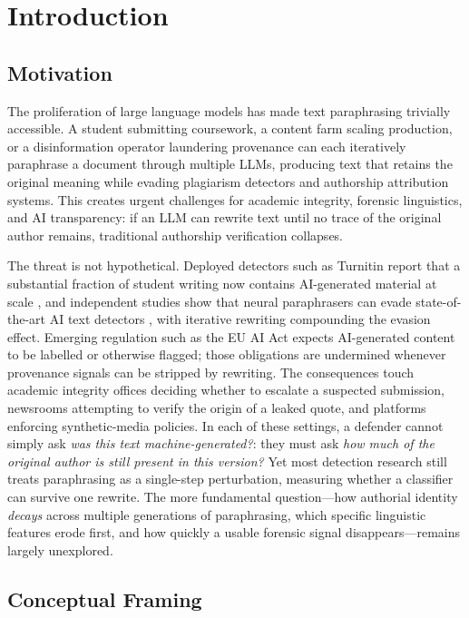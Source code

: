 \section{Introduction}

\subsection{Motivation}

The proliferation of large language models has made text paraphrasing trivially accessible. A student submitting coursework, a content farm scaling production, or a disinformation operator laundering provenance can each iteratively paraphrase a document through multiple LLMs, producing text that retains the original meaning while evading plagiarism detectors and authorship attribution systems. This creates urgent challenges for academic integrity, forensic linguistics, and AI transparency: if an LLM can rewrite text until no trace of the original author remains, traditional authorship verification collapses.

The threat is not hypothetical. Deployed detectors such as Turnitin report that a substantial fraction of student writing now contains AI-generated material at scale \cite{turnitin2024aiwriting}, and independent studies show that neural paraphrasers can evade state-of-the-art AI text detectors \cite{krishna2023dipper}, with iterative rewriting compounding the evasion effect. Emerging regulation such as the EU AI Act \cite{euaiact2024} expects AI-generated content to be labelled or otherwise flagged; those obligations are undermined whenever provenance signals can be stripped by rewriting. The consequences touch academic integrity offices deciding whether to escalate a suspected submission, newsrooms attempting to verify the origin of a leaked quote, and platforms enforcing synthetic-media policies. In each of these settings, a defender cannot simply ask \emph{was this text machine-generated?}: they must ask \emph{how much of the original author is still present in this version?} Yet most detection research still treats paraphrasing as a single-step perturbation, measuring whether a classifier can survive one rewrite. The more fundamental question---how authorial identity \emph{decays} across multiple generations of paraphrasing, which specific linguistic features erode first, and how quickly a usable forensic signal disappears---remains largely unexplored.

\subsection{Conceptual Framing}

